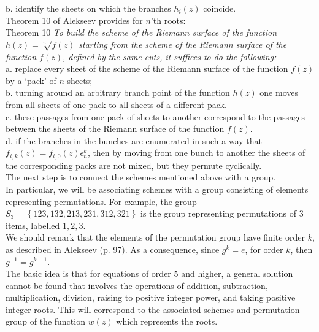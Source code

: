 b. identify the sheets on which the branches $h_{i}\left(z\right)$ coincide.\\

Theorem 10 of Alekseev provides for $n$'th roots:\\

Theorem 10 \textit{To build the scheme of the Riemann surface of the function $h\left(z\right)=\sqrt[n]{f\left(z\right)}$ starting from the scheme of the Riemann surface of the function $f\left(z\right)$, defined by the same cuts, it suffices to do the following:}\\

a. replace every sheet of the scheme of the Riemann surface of the function $f\left(z\right)$ by a `pack' of $n$ sheets;\\
b. turning around an arbitrary branch point of the function $h\left(z\right)$ one moves from all sheets of one pack to all sheets of a different pack.\\
c. these passages from one pack of sheets to another correspond to the passages between the sheets of the Riemann surface of the function $f\left(z\right)$.\\
d.  if the branches in the bunches are enumerated in such a way that $f_{i,k}\left(z\right)=f_{i,0}\left(z\right)\epsilon_{n}^{k}$, then by moving from one bunch to another the sheets of the corresponding packs are not mixed, but they permute cyclically.\\

The next step is to connect the schemes mentioned above with a group.\\

In particular, we will be associating schemes with a group consisting of elements representing permutations.  For example, the group $S_{3} = \left\{123,132,213,231,312,321\right\}$ is the group representing permutations of $3$ items, labelled $1,2,3$.\\

We should remark that the elements of the permutation group have finite order $k$, as described in Alekseev (p. 97).  As a consequence, since $g^{k}=e$, for order $k$, then $g^{-1}=g^{k-1}$.\\

The basic idea is that for equations of order $5$ and higher, a general solution cannot be found that involves the operations of addition, subtraction, multiplication, division, raising to positive integer power, and taking positive integer roots.  This will correspond to the associated schemes and permutation group of the function $w\left(z\right)$ which represents the roots.\\

